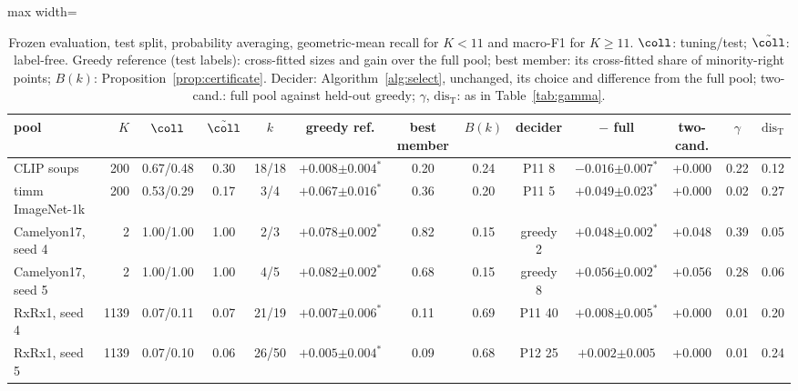 \begin{table}[t]
\centering
\footnotesize
\caption{Frozen evaluation, test split, probability averaging, geometric-mean recall for $K<11$ and macro-F1 for $K\ge11$. $\coll$: tuning/test; $\tilde\coll$: label-free. Greedy reference (test labels): cross-fitted sizes and gain over the full pool; best member: its cross-fitted share of minority-right points; $B(k)$: Proposition~\ref{prop:certificate}. Decider: Algorithm~\ref{alg:select}, unchanged, its choice and difference from the full pool; two-cand.: full pool against held-out greedy; $\gamma$, $\mathrm{dis}_{\mathrm T}$: as in Table~\ref{tab:gamma}.}
\label{tab:frozen}
\setlength{\tabcolsep}{2.5pt}\begin{adjustbox}{max width=\linewidth}
\begin{tabular}{lrccccccccccc}
\toprule
pool & $K$ & $\coll$ & $\tilde\coll$ & $k$ & greedy ref. & best member & $B(k)$ & decider & $-$ full & two-cand. & $\gamma$ & $\mathrm{dis}_{\mathrm T}$ \\
\midrule
CLIP soups & 200 & 0.67/0.48 & 0.30 & 18/18 & $+0.008{\scriptstyle\pm0.004}^{\ast}$ & 0.20 & 0.24 & P11 8 & $-0.016{\scriptstyle\pm0.007}^{\ast}$ & +0.000 & 0.22 & 0.12 \\
timm ImageNet-1k & 200 & 0.53/0.29 & 0.17 & 3/4 & $+0.067{\scriptstyle\pm0.016}^{\ast}$ & 0.36 & 0.20 & P11 5 & $+0.049{\scriptstyle\pm0.023}^{\ast}$ & +0.000 & 0.02 & 0.27 \\
Camelyon17, seed 4 & 2 & 1.00/1.00 & 1.00 & 2/3 & $+0.078{\scriptstyle\pm0.002}^{\ast}$ & 0.82 & 0.15 & greedy 2 & $+0.048{\scriptstyle\pm0.002}^{\ast}$ & +0.048 & 0.39 & 0.05 \\
Camelyon17, seed 5 & 2 & 1.00/1.00 & 1.00 & 4/5 & $+0.082{\scriptstyle\pm0.002}^{\ast}$ & 0.68 & 0.15 & greedy 8 & $+0.056{\scriptstyle\pm0.002}^{\ast}$ & +0.056 & 0.28 & 0.06 \\
RxRx1, seed 4 & 1139 & 0.07/0.11 & 0.07 & 21/19 & $+0.007{\scriptstyle\pm0.006}^{\ast}$ & 0.11 & 0.69 & P11 40 & $+0.008{\scriptstyle\pm0.005}^{\ast}$ & +0.000 & 0.01 & 0.20 \\
RxRx1, seed 5 & 1139 & 0.07/0.10 & 0.06 & 26/50 & $+0.005{\scriptstyle\pm0.004}^{\ast}$ & 0.09 & 0.68 & P12 25 & $+0.002{\scriptstyle\pm0.005}$ & +0.000 & 0.01 & 0.24 \\
\bottomrule
\end{tabular}
\end{adjustbox}
\end{table}
